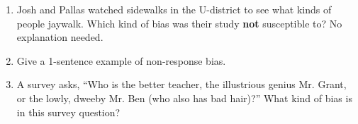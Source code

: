 \documentclass[12pt]{article}
\begin{document}
\begin{enumerate}
\item Josh and Pallas watched sidewalks in the U-district to see what kinds of people jaywalk. Which kind of bias was their study \textbf{not} susceptible to? No explanation needed. \vspace{5mm}

\item Give a 1-sentence example of non-response bias. \vspace{10mm}

	\item A survey asks, ``Who is the better teacher, the illustrious genius Mr. Grant, or the lowly, dweeby Mr. Ben (who also has bad hair)?'' What kind of bias is in this survey question?

\end{enumerate}	
\end{document}
